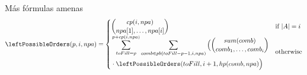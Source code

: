 \begin{frame}{Más fórmulas amenas}
	\scriptsize
	\[
	\leftPossibleOrders(p,i,npa) = 
	\begin{cases} 
		\begin{aligned}
			\binom{ cp(i, npa)}{npa[1], \ldots, npa[i]} 
		\end{aligned} & \text{if $|A|=i$} \\
		\begin{aligned}
			&\sum_{toFill=p}^{p+cp(i,npa)} \sum_{comb \in pb(toFill-p-1,i, npa)} \Big(\binom{ sum(comb)}{comb_1, \ldots, comb_i} \\
			&  \cdot \leftPossibleOrders(toFill,i+1,hp(comb, npa)\Big)
		\end{aligned}
		& \text{otherwise}
	\end{cases}
	\]
\end{frame}

\begin{comment}
	\begin{frame}[fragile]{Clases en Árboles No Relacionados}
		\dificultyLevel{4}
		\begin{itemize}
			\item \textbf{Recordemos:} $UR$ = raíces de subárboles sin relación causal con $x_i$. 
			\item La función devuelve un conjunto de tuplas de la forma $(\equivalenceClassRep, leftTopos, rightTopos)$.
		\end{itemize}
		
		\pause 
		\begin{align*}\label{formula:unrelated_equiv_classes}
			\unrEqCl(n) = 
			\begin{cases} 
				\set{(\set{n_l}, 1, 1), (\set{n_r},1,1)} & \text{si $n$ es una hoja} \\[1ex]
				\begin{aligned}
					&\left( \bigcup_{\forall mix \in \unrEqCl(n_1) \times \dots \times \unrEqCl(n_{|n|})} \hspace{-5em} \union(mix,n_{left})\right) \\
					&\cup \union(right,n_{right})
				\end{aligned} & \text{cc}
			\end{cases}
		\end{align*}
	\end{frame}
\end{comment}

